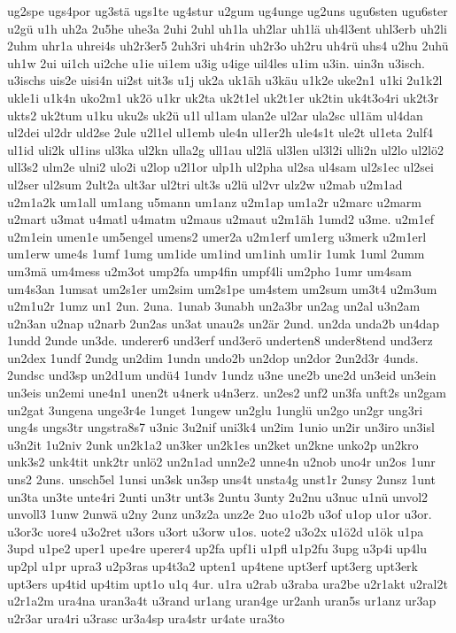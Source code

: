 {ug2spe
ugs4por
ug3stä
ugs1te
ug4stur
u2gum
ug4unge
ug2uns
ugu6sten
ugu6ster
u2gü
u1h
uh2a
2u5he
uhe3a
2uhi
2uhl
uh1la
uh2lar
uh1lä
uh4l3ent
uhl3erb
uh2li
2uhm
uhr1a
uhrei4s
uh2r3er5
2uh3ri
uh4rin
uh2r3o
uh2ru
uh4rü
uhs4
u2hu
2uhü
uh1w
2ui
ui1ch
ui2che
u1ie
ui1em
u3ig
u4ige
uil4les
u1im
u3in.
uin3n
u3isch.
u3ischs
uis2e
uisi4n
ui2st
uit3s
u1j
uk2a
uk1äh
u3käu
u1k2e
uke2n1
u1ki
2u1k2l
ukle1i
u1k4n
uko2m1
uk2ö
u1kr
uk2ta
uk2t1el
uk2t1er
uk2tin
uk4t3o4ri
uk2t3r
ukts2
uk2tum
u1ku
uku2s
uk2ü
u1l
ul1am
ulan2e
ul2ar
ula2sc
ul1äm
ul4dan
ul2dei
ul2dr
uld2se
2ule
u2l1el
ul1emb
ule4n
ul1er2h
ule4s1t
ule2t
ul1eta
2ulf4
ul1id
uli2k
ul1ins
ul3ka
ul2kn
ulla2g
ull1au
ul2lä
ul3len
ul3l2i
ulli2n
ul2lo
ul2lö2
ull3s2
ulm2e
ulni2
ulo2i
u2lop
u2l1or
ulp1h
ul2pha
ul2sa
ul4sam
ul2s1ec
ul2sei
ul2ser
ul2sum
2ult2a
ult3ar
ul2tri
ult3s
u2lü
ul2vr
ulz2w
u2mab
u2m1ad
u2m1a2k
um1all
um1ang
u5mann
um1anz
u2m1ap
um1a2r
u2marc
u2marm
u2mart
u3mat
u4matl
u4matm
u2maus
u2maut
u2m1äh
1umd2
u3me.
u2m1ef
u2m1ein
umen1e
um5engel
umens2
umer2a
u2m1erf
um1erg
u3merk
u2m1erl
um1erw
ume4s
1umf
1umg
um1ide
um1ind
um1inh
um1ir
1umk
1uml
2umm
um3mä
um4mess
u2m3ot
ump2fa
ump4fin
umpf4li
um2pho
1umr
um4sam
um4s3an
1umsat
um2s1er
um2sim
um2s1pe
um4stem
um2sum
um3t4
u2m3um
u2m1u2r
1umz
un1
2un.
2una.
1unab
3unabh
un2a3br
un2ag
un2al
u3n2am
u2n3an
u2nap
u2narb
2un2as
un3at
unau2s
un2är
2und.
un2da
unda2b
un4dap
1undd
2unde
un3de.
underer6
und3erf
und3erö
underten8
under8tend
und3erz
un2dex
1undf
2undg
un2dim
1undn
undo2b
un2dop
un2dor
2un2d3r
4unds.
2undsc
und3sp
un2d1um
undü4
1undv
1undz
u3ne
une2b
une2d
un3eid
un3ein
un3eis
un2emi
une4n1
unen2t
u4nerk
u4n3erz.
un2es2
unf2
un3fa
unft2s
un2gam
un2gat
3ungena
unge3r4e
1unget
1ungew
un2glu
1unglü
un2go
un2gr
ung3ri
ung4s
ungs3tr
ungstra8s7
u3nic
3u2nif
uni3k4
un2im
1unio
un2ir
un3iro
un3isl
u3n2it
1u2niv
2unk
un2k1a2
un3ker
un2k1es
un2ket
un2kne
unko2p
un2kro
unk3s2
unk4tit
unk2tr
unlö2
un2n1ad
unn2e2
unne4n
u2nob
uno4r
un2os
1unr
uns2
2uns.
unsch5el
1unsi
un3sk
un3sp
uns4t
unsta4g
unst1r
2unsy
2unsz
1unt
un3ta
un3te
unte4ri
2unti
un3tr
unt3s
2untu
3unty
2u2nu
u3nuc
u1nü
unvol2
unvoll3
1unw
2unwä
u2ny
2unz
un3z2a
unz2e
2uo
u1o2b
u3of
u1op
u1or
u3or.
u3or3c
uore4
u3o2ret
u3ors
u3ort
u3orw
u1os.
uote2
u3o2x
u1ö2d
u1ök
u1pa
3upd
u1pe2
uper1
upe4re
uperer4
up2fa
upf1i
u1pfl
u1p2fu
3upg
u3p4i
up4lu
up2pl
u1pr
upra3
u2p3ras
up4t3a2
upten1
up4tene
upt3erf
upt3erg
upt3erk
upt3ers
up4tid
up4tim
upt1o
u1q
4ur.
u1ra
u2rab
u3raba
ura2be
u2r1akt
u2ral2t
u2r1a2m
ura4na
uran3a4t
u3rand
ur1ang
uran4ge
ur2anh
uran5s
ur1anz
ur3ap
u2r3ar
ura4ri
u3rasc
ur3a4sp
ura4str
ur4ate
ura3to
}
